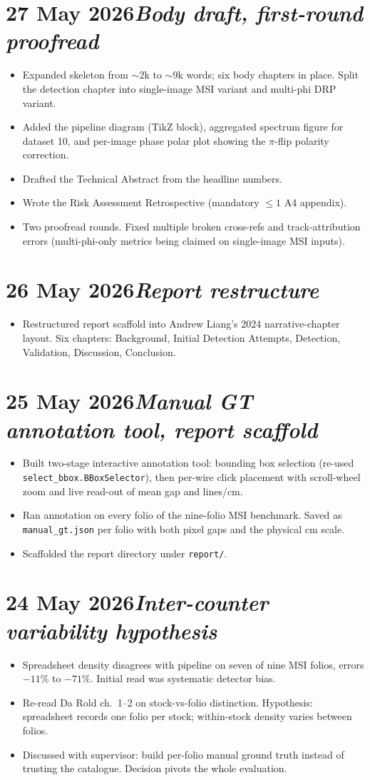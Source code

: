 \documentclass[11pt,a4paper]{article}
\newcommand{\logentry}[2]{\section*{#1\hfill\normalfont\normalsize\textit{#2}}}
\begin{document}
\logentry{27 May 2026}{Body draft, first-round proofread}
\begin{itemize}
  \item Expanded skeleton from $\sim$2k to $\sim$9k words; six body chapters in place. Split the detection chapter into single-image MSI variant and multi-phi DRP variant.
  \item Added the pipeline diagram (TikZ block), aggregated spectrum figure for dataset 10, and per-image phase polar plot showing the $\pi$-flip polarity correction.
  \item Drafted the Technical Abstract from the headline numbers.
  \item Wrote the Risk Assessment Retrospective (mandatory $\leq 1$ A4 appendix).
  \item Two proofread rounds. Fixed multiple broken cross-refs and track-attribution errors (multi-phi-only metrics being claimed on single-image MSI inputs).
\end{itemize}

\logentry{26 May 2026}{Report restructure}
\begin{itemize}
  \item Restructured report scaffold into Andrew Liang's 2024 narrative-chapter layout. Six chapters: Background, Initial Detection Attempts, Detection, Validation, Discussion, Conclusion.
\end{itemize}

\logentry{25 May 2026}{Manual GT annotation tool, report scaffold}
\begin{itemize}
  \item Built two-stage interactive annotation tool: bounding box selection (re-used \texttt{select\_bbox.BBoxSelector}), then per-wire click placement with scroll-wheel zoom and live read-out of mean gap and lines/cm.
  \item Ran annotation on every folio of the nine-folio MSI benchmark. Saved as \texttt{manual\_gt.json} per folio with both pixel gaps and the physical cm scale.
  \item Scaffolded the report directory under \texttt{report/}.
\end{itemize}

\logentry{24 May 2026}{Inter-counter variability hypothesis}
\begin{itemize}
  \item Spreadsheet density disagrees with pipeline on seven of nine MSI folios, errors $-11$\% to $-71$\%. Initial read was systematic detector bias.
  \item Re-read Da Rold ch.~1--2 on stock-vs-folio distinction. Hypothesis: spreadsheet records one folio per stock; within-stock density varies between folios.
  \item Discussed with supervisor: build per-folio manual ground truth instead of trusting the catalogue. Decision pivots the whole evaluation.
\end{itemize}
\end{document}
